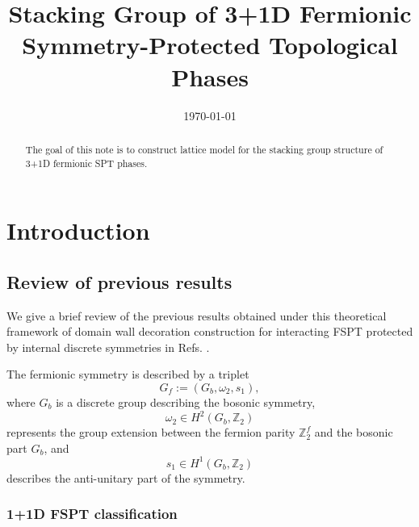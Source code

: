 \documentclass[%
 reprint,
 amsmath,amssymb,
 aps,
prb,
]{revtex4-2}
\begin{document}

\title{Stacking Group of 3+1D Fermionic Symmetry-Protected Topological Phases}

\date{\today}%

\begin{abstract}
The goal of this note is to construct lattice model for the stacking group structure of 3+1D fermionic SPT phases. 
\end{abstract}

\maketitle

\tableofcontents

\section{Introduction}

\subsection{Review of previous results}

We give a brief review of the previous results obtained under this theoretical framework of domain wall decoration construction for interacting FSPT protected by internal discrete symmetries in Refs. \cite{Wang2018, Wang2020, ren2023stacking, Ning2025unpub}.

The fermionic symmetry is described by a triplet 
\begin{equation}
G_f := (G_b, \omega_2, s_1), 
\end{equation}
where $G_b$ is a discrete group describing the bosonic symmetry, 
\begin{equation}
\omega_2 \in H^2(G_b, \mathbb Z_2)
\end{equation} represents the group extension between the fermion parity $\mathbb Z_2^f$ and the bosonic part $G_b$, and 
\begin{equation}
s_1 \in H^1(G_b, \mathbb Z_2)
\end{equation} 
describes the anti-unitary part of the symmetry.

\subsubsection{1+1D FSPT classification}
\end{document}

